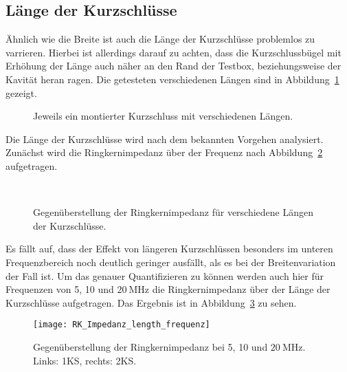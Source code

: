 \subsection{L\"ange der Kurzschl\"usse}
\"Ahnlich wie die Breite ist auch die L\"ange der Kurzschl\"usse problemlos zu varrieren. Hierbei ist allerdings darauf zu achten, dass die Kurzschlussb\"ugel mit Erh\"ohung der L\"ange auch n\"aher an den Rand der Testbox, beziehungsweise der Kavit\"at heran ragen. Die getesteten verschiedenen L\"angen sind in Abbildung~\ref{fig:ringcoreheightCST} gezeigt.

\begin{figure}[htb]
	\centering
	\hspace{0.05\textwidth}
	\hspace{0.05\textwidth}
	\caption{Jeweils ein montierter Kurzschluss mit verschiedenen L\"angen.}
	\label{fig:ringcoreheightCST}
\end{figure}

Die L\"ange der Kurzschl\"usse wird nach dem bekannten Vorgehen analysiert. Zun\"achst wird die Ringkernimpedanz \"uber der Frequenz nach Abbildung~\ref{fig:ringcoreheight} aufgetragen.

\begin{figure}[htb]
	\centering
	\\
	\caption{Gegen\"uberstellung der Ringkernimpedanz f\"ur verschiedene L\"angen der Kurzschl\"usse.}
	\label{fig:ringcoreheight}
\end{figure}

Es f\"allt auf, dass der Effekt von l\"angeren Kurzschl\"ussen besonders im unteren Frequenzbereich noch deutlich geringer ausf\"allt, als es bei der Breitenvariation der Fall ist. Um das genauer Quantifizieren zu k\"onnen werden auch hier f\"ur Frequenzen von 5, 10 und $\SI{20}{\mega\hertz}$ die Ringkernimpedanz \"uber der L\"ange der Kurzschl\"usse aufgetragen. Das Ergebnis ist in Abbildung~\ref{fig:ringcoreheight20} zu sehen.




\newpage



\begin{figure}[htb]
	\centering
	\texttt{[image: RK\_Impedanz\_length\_frequenz]}
	\caption{Gegen\"uberstellung der Ringkernimpedanz bei 5, 10 und $\SI{20}{\mega\hertz}$. Links: 1KS, rechts: 2KS.}
	\label{fig:ringcoreheight20}
\end{figure}

